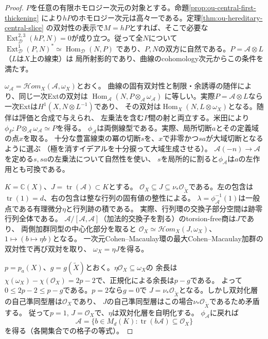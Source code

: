 \documentclass[11pt,a4paper]{ltjsarticle}
\theoremstyle{definition}
\begin{document}
\begin{proof}
$P$を任意の有限ホモロジー次元の対象とする。命題\ref{prop:ou-central-first-thickening}
により$hP$のホモロジー次元は高々一である。定理\ref{thm:ou-hereditary-central-slice}
の双対性の表示で$M=hP$とすれば、そこで必要な
$\operatorname{Ext}^{2,3}_{\mathcal D}(hP,N)=0$が成り立つ。従って全$N$について
$\operatorname{Ext}^1_{\mathcal D}(P,N)^*\simeq\operatorname{Hom}_{\mathcal D}(N,P)$
であり、$P,N$の双方に自然である。$P=\mathcal A\otimes L$（$L$は$X$上の線束）は
局所射影的であり、曲線のcohomology次元からこの条件を満たす。

$\omega_{\mathcal A}=\mathcal Hom_X(\mathcal A,\omega_X)$とおく。
曲線の固有双対性と制限・余誘導の随伴により、同じ一次Extの双対は
$\operatorname{Hom}_{\mathcal A}(N,P\otimes_{\mathcal A}\omega_{\mathcal A})$
に等しい。実際$P=\mathcal A\otimes L$なら一次Extは$H^1(X,N\otimes L^{-1})$であり、
その双対は$\operatorname{Hom}_X(N,L\otimes\omega_X)$となる。随伴は評価と合成で与えられ、
左乗法を含む$P$間の射と両立する。米田により
$\phi_P:P\otimes_{\mathcal A}\omega_{\mathcal A}\simeq P$を得る。
$\phi_{\mathcal A}$は両側線型である。実際、局所切断$a$とその定義域の点$x$を取る。
十分な豊富線束の冪の切断$s$を、$x$で非零かつ$sa$が大域切断となるように選ぶ
（極を消すイデアルを十分捩って大域生成させる）。
$\mathcal A(-n)\to\mathcal A$を定める$s,sa$の左乗法について自然性を使い、
$s$を局所的に割ると$\phi_{\mathcal A}$は$a$の左作用とも可換である。

$K=\mathbb C(X)$、$J=\operatorname{tr}(\mathcal A)\subset K$とする。
$\mathcal O_X\subseteq J\subseteq\nu_*\mathcal O_{\widetilde X}$である。左の包含は
$\operatorname{tr}(1)=d$、右の包含は整な行列の固有値の整性による。
$\lambda=\phi_{\mathcal A}^{-1}(1)$は一般点である有理微分$\eta$と行列跡の積である。
実際、行列環の交換子部分空間は跡零行列全体である。
$\mathcal A/[\mathcal A,\mathcal A]$（加法的交換子を割る）のtorsion-free商は$J$であり、
両側加群同型の中心化部分を取ると
$\mathcal O_X\simeq\mathcal Hom_X(J,\omega_X)$、$1\mapsto (b\mapsto\eta b)$となる。
一次元Cohen--Macaulay環の最大Cohen--Macaulay加群の双対性で再び双対を取り、
$\omega_X=\eta J$を得る。

$p=p_a(X)$、$g=g(\widetilde X)$とおく。$\eta\mathcal O_X\subseteq\omega_X$の
余長は$\chi(\omega_X)-\chi(\mathcal O_X)=2p-2$で、正規化による余長は$p-g$である。
よって$0\le2p-2\le p-g$である。$p=2$なら$g=0$で
$J=\nu_*\mathcal O_{\widetilde X}$となる。しかし双対化層の自己準同型層は$\mathcal O_X$であり、
$J$の自己準同型層はこの場合$\nu_*\mathcal O_{\widetilde X}$であるため矛盾する。
従って$p=1$, $J=\mathcal O_X$で、$\eta$は双対化層を自明化する。
$\phi_{\mathcal A}$に戻れば
\[
 \mathcal A=\{b\in M_d(K):\operatorname{tr}(b\mathcal A)\subseteq\mathcal O_X\}
\]
を得る（各開集合での格子の等式）。


\end{proof}
\end{document}
